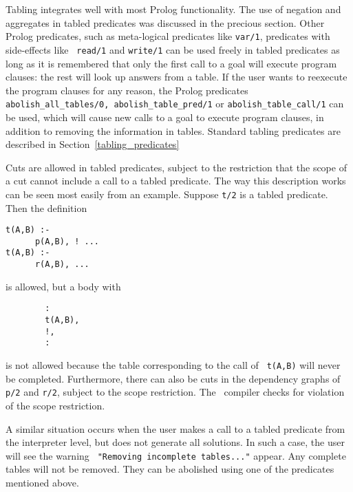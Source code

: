 Tabling integrates well with most Prolog functionality.  The use of
negation and aggregates in tabled predicates was discussed in the
precious section.  Other Prolog predicates, such as meta-logical
predicates like {\tt var/1}, predicates with side-effects like {\tt
read/1} and {\tt write/1} can be used freely in tabled predicates as
long as it is remembered that only the first call to a goal will
execute program clauses: the rest will look up answers from a table.
If the user wants to reexecute the program clauses for any reason, the
Prolog predicates {\tt abolish\_all\_tables/0, abolish\_table\_pred/1}
or {\tt abolish\_table\_call/1} can be used, which will cause new
calls to a goal to execute program clauses, in addition to removing
the information in tables.  Standard tabling predicates are described
in Section~\ref{tabling_predicates}

Cuts are allowed in tabled predicates, subject to the restriction that
the scope of a cut cannot include a call to a tabled predicate.  The
way this description works can be seen most easily from an example.
Suppose {\tt t/2} is a tabled predicate.  Then the definition
\begin{center}
\begin{minipage}{1.7in}
\begin{verbatim}
t(A,B) :-
      p(A,B), ! ...
t(A,B) :- 
      r(A,B), ...
\end{verbatim}						       
\end{minipage}
\end{center}
is allowed, but a body with
\begin{center}
\begin{minipage}{1.5in}
\begin{verbatim}
        :
        t(A,B),
        !,
        :
\end{verbatim}						       
\end{minipage}
\end{center}
is not allowed because the table corresponding to the call of {\tt
t(A,B)} will never be completed.  Furthermore, there can also be cuts
in the dependency graphs of {\tt p/2} and {\tt r/2}, subject to the
scope restriction.  The \ourprolog\ compiler checks for violation of
the scope restriction.

A similar situation occurs when the user makes a call to a tabled
predicate from the interpreter level, but does not generate all
solutions.  In such a case, the user will see the warning {\tt
"Removing incomplete tables..."} appear.  Any complete tables will
not be removed.  They can be abolished using one of the predicates
mentioned above.

